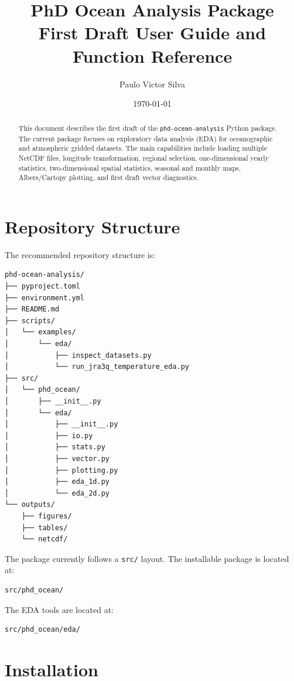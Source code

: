 \documentclass[11pt,a4paper]{article}
\title{\textbf{PhD Ocean Analysis Package}\\
\large First Draft User Guide and Function Reference}
\author{Paulo Victor Silva}
\date{\today}
\begin{document}
\maketitle

\begin{abstract}
This document describes the first draft of the \texttt{phd-ocean-analysis} Python package.
The current package focuses on exploratory data analysis (EDA) for oceanographic and
atmospheric gridded datasets. The main capabilities include loading multiple NetCDF files,
longitude transformation, regional selection, one-dimensional yearly statistics, two-dimensional
spatial statistics, seasonal and monthly maps, Albers/Cartopy plotting, and first draft vector
diagnostics.
\end{abstract}

\tableofcontents
\newpage

\section{Repository Structure}

The recommended repository structure is:

\begin{lstlisting}[style=bashstyle]
phd-ocean-analysis/
├── pyproject.toml
├── environment.yml
├── README.md
├── scripts/
│   └── examples/
│       └── eda/
│           ├── inspect_datasets.py
│           └── run_jra3q_temperature_eda.py
├── src/
│   └── phd_ocean/
│       ├── __init__.py
│       └── eda/
│           ├── __init__.py
│           ├── io.py
│           ├── stats.py
│           ├── vector.py
│           ├── plotting.py
│           ├── eda_1d.py
│           └── eda_2d.py
└── outputs/
    ├── figures/
    ├── tables/
    └── netcdf/
\end{lstlisting}

The package currently follows a \texttt{src/} layout. The installable package is located at:

\begin{lstlisting}[style=bashstyle]
src/phd_ocean/
\end{lstlisting}

The EDA tools are located at:

\begin{lstlisting}[style=bashstyle]
src/phd_ocean/eda/
\end{lstlisting}

\section{Installation}
\end{document}
